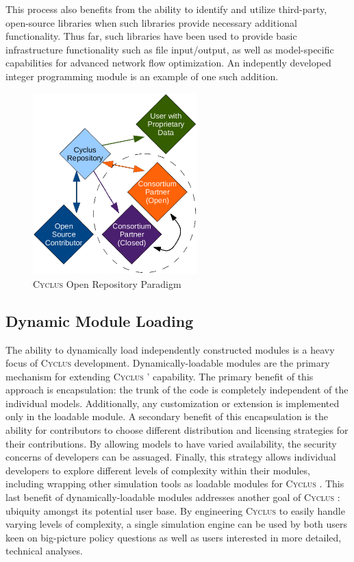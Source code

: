 \documentclass{anstrans}
\newcommand{\Cyclus}{\textsc{Cyclus }}
\begin{document}
This process also benefits from the ability to identify and utilize third-party, open-source libraries when such libraries provide necessary additional functionality. Thus far, such libraries have been used to provide basic infrastructure functionality such as file input/output, as well as model-specific capabilities for advanced network flow optimization. An indepently developed integer programming module is an example of one such addition.

\begin{figure}[h]
  \begin{center}
    \includegraphics[height=7cm]{openness.eps}
  \end{center}
  \caption{\Cyclus Open Repository Paradigm}
  \label{fig:openness}
\end{figure}
\subsection{Dynamic Module Loading}
The ability to dynamically load independently constructed modules is a heavy focus of \Cyclus development. Dynamically-loadable modules are the primary mechanism for extending \Cyclus' capability. The primary benefit of this approach is encapsulation: the trunk of the code is completely independent of the individual models. Additionally, any customization or extension is implemented only in the loadable module. A secondary benefit of this encapsulation is the ability for contributors to choose different distribution and licensing strategies for their contributions. By allowing models to have varied availability, the security concerns of developers can be assuaged. Finally, this strategy allows individual developers to explore different levels of complexity within their modules, including wrapping other simulation tools as loadable modules for \Cyclus. This last benefit of dynamically-loadable modules addresses another goal of \Cyclus: ubiquity amongst its potential user base. By engineering \Cyclus to easily handle varying levels of complexity, a single simulation engine can be used by both users keen on big-picture policy questions as well as users interested in more detailed, technical analyses.
\end{document}
